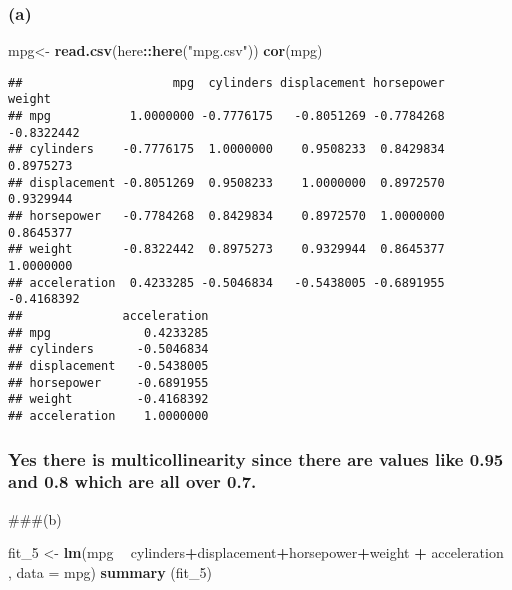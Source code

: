 \documentclass[
]{article}
\newenvironment{Shaded}{\begin{snugshade}}{\end{snugshade}}
\newcommand{\DataTypeTok}[1]{\textcolor[rgb]{0.13,0.29,0.53}{#1}}
\newcommand{\DecValTok}[1]{\textcolor[rgb]{0.00,0.00,0.81}{#1}}
\newcommand{\KeywordTok}[1]{\textcolor[rgb]{0.13,0.29,0.53}{\textbf{#1}}}
\newcommand{\NormalTok}[1]{#1}
\newcommand{\OperatorTok}[1]{\textcolor[rgb]{0.81,0.36,0.00}{\textbf{#1}}}
\newcommand{\StringTok}[1]{\textcolor[rgb]{0.31,0.60,0.02}{#1}}
\begin{document}
\hypertarget{a-1}{%
\subsubsection{(a)}\label{a-1}}

\begin{Shaded}
\begin{Highlighting}[]
\NormalTok{mpg<-}\StringTok{ }\KeywordTok{read.csv}\NormalTok{(here}\OperatorTok{::}\KeywordTok{here}\NormalTok{(}\StringTok{"mpg.csv"}\NormalTok{))}
\KeywordTok{cor}\NormalTok{(mpg)}
\end{Highlighting}
\end{Shaded}

\begin{verbatim}
##                     mpg  cylinders displacement horsepower     weight
## mpg           1.0000000 -0.7776175   -0.8051269 -0.7784268 -0.8322442
## cylinders    -0.7776175  1.0000000    0.9508233  0.8429834  0.8975273
## displacement -0.8051269  0.9508233    1.0000000  0.8972570  0.9329944
## horsepower   -0.7784268  0.8429834    0.8972570  1.0000000  0.8645377
## weight       -0.8322442  0.8975273    0.9329944  0.8645377  1.0000000
## acceleration  0.4233285 -0.5046834   -0.5438005 -0.6891955 -0.4168392
##              acceleration
## mpg             0.4233285
## cylinders      -0.5046834
## displacement   -0.5438005
## horsepower     -0.6891955
## weight         -0.4168392
## acceleration    1.0000000
\end{verbatim}

\hypertarget{yes-there-is-multicollinearity-since-there-are-values-like-0.95-and-0.8-which-are-all-over-0.7.}{%
\subsubsection{Yes there is multicollinearity since there are values
like 0.95 and 0.8 which are all over
0.7.}\label{yes-there-is-multicollinearity-since-there-are-values-like-0.95-and-0.8-which-are-all-over-0.7.}}

\#\#\#(b)

\begin{Shaded}
\begin{Highlighting}[]
\NormalTok{fit_}\DecValTok{5}\NormalTok{ <-}\StringTok{ }\KeywordTok{lm}\NormalTok{(mpg }\OperatorTok{~}\StringTok{ }\NormalTok{cylinders}\OperatorTok{+}\NormalTok{displacement}\OperatorTok{+}\NormalTok{horsepower}\OperatorTok{+}\NormalTok{weight }\OperatorTok{+}\StringTok{ }\NormalTok{acceleration , }\DataTypeTok{data =}\NormalTok{ mpg)}
\KeywordTok{summary}\NormalTok{ (fit_}\DecValTok{5}\NormalTok{)}
\end{Highlighting}
\end{Shaded}
\end{document}
